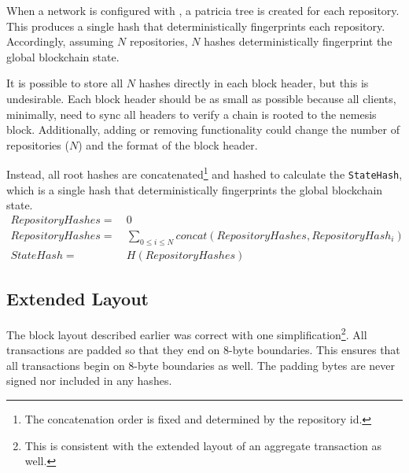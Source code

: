 When a network is configured with , a patricia tree is created for each repository.
This produces a single hash that deterministically fingerprints each repository.
Accordingly, assuming $N$ repositories, $N$ hashes deterministically fingerprint the global blockchain state.

It is possible to store all $N$ hashes directly in each block header, but this is undesirable.
Each block header should be as small as possible because all clients, minimally, need to sync all headers to verify a chain is rooted to the nemesis block.
Additionally, adding or removing functionality could change the number of repositories ($N$) and the format of the block header.

Instead, all root hashes are concatenated\footnote{The concatenation order is fixed and determined by the repository id.} and hashed to calculate the \texttt{StateHash}, which is a single hash that deterministically fingerprints the global blockchain state.
\begin{align*}
RepositoryHashes = \: & 0 \\
RepositoryHashes = \: & \sum_{0\leq i \leq N} concat(RepositoryHashes, RepositoryHash_i) \\
StateHash = \: & H(RepositoryHashes)
\end{align*}

\subsection{Extended Layout}

The block layout described earlier was correct with one simplification\footnote{
This is consistent with the extended layout of an aggregate transaction as well.}.
All transactions are padded so that they end on 8-byte boundaries.
This ensures that all transactions begin on 8-byte boundaries as well.
The padding bytes are never signed nor included in any hashes.

\begin{figure}[H]
\end{figure}
